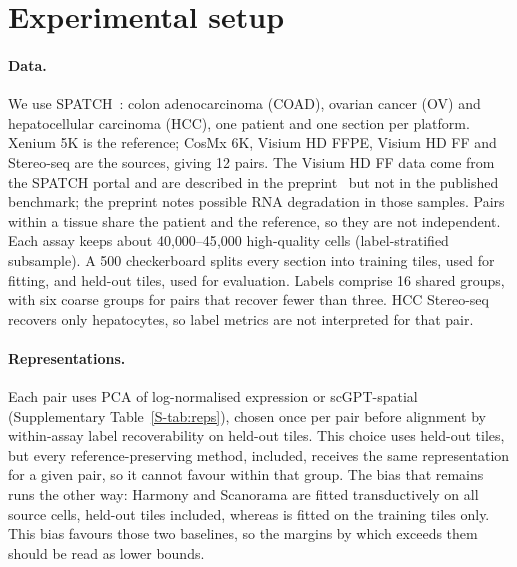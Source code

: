\section{Experimental setup}\label{sec:setup}

\paragraph{Data.}\label{sec:data}
We use SPATCH~\citep{ren2025spatch}: colon adenocarcinoma (COAD), ovarian cancer (OV) and hepatocellular carcinoma (HCC),
one patient and one section per platform. Xenium 5K is the reference; CosMx 6K, Visium HD FFPE, Visium HD FF and
Stereo-seq are the sources, giving 12 pairs. The Visium HD FF data come from the SPATCH portal and are
described in the preprint~\citep{ren2024spatchpreprint} but not in the published benchmark; the preprint notes
possible RNA degradation in those samples. Pairs within a tissue share the patient and the reference, so they are
not independent. Each assay keeps about 40{,}000--45{,}000 high-quality cells (label-stratified subsample). A 500\um
checkerboard splits every section into training tiles, used for fitting, and held-out tiles, used for evaluation.
Labels comprise 16 shared groups, with six coarse groups for pairs that recover fewer than three. HCC Stereo-seq
recovers only hepatocytes, so label metrics are not interpreted for that pair.

\paragraph{Representations.}\label{sec:reps}
Each pair uses PCA of log-normalised expression or scGPT-spatial~\citep{wang2025scgptspatial} (Supplementary
Table~\ref{S-tab:reps}), chosen once per pair before alignment by within-assay label recoverability on held-out tiles.
This choice uses held-out tiles, but every reference-preserving method, \frost included, receives the same
representation for a given pair, so it cannot favour \frost within that group. The bias that remains runs the other
way: Harmony and Scanorama are fitted transductively on all source cells, held-out tiles included, whereas \frost is
fitted on the training tiles only. This bias favours those two baselines, so the margins by which \frost exceeds them
should be read as lower bounds.

